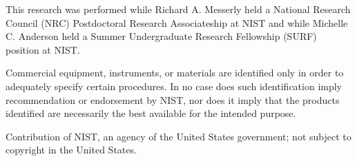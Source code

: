 \documentclass[journal=jced,manuscript=article]{achemso}
\begin{document}
This research was performed while Richard A. Messerly held a National Research Council (NRC) Postdoctoral Research Associateship at NIST and while Michelle C. Anderson held a Summer Undergraduate Research Fellowship (SURF) position at NIST. 

Commercial equipment, instruments, or materials are identified only in order to adequately specify certain procedures. In no case does such identification imply recommendation or endorsement by NIST, nor does it imply that the products identified are necessarily the best available for the intended purpose.

Contribution of NIST, an agency of the United States government; not subject to copyright in the United States.



%
%
%
%
%
%
\end{document}
